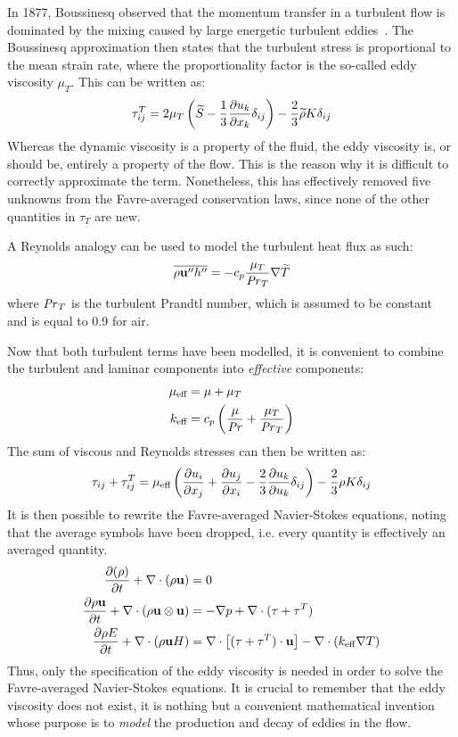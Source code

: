In 1877, Boussinesq observed that the momentum transfer in a turbulent flow is dominated by the mixing caused by large energetic turbulent eddies~\cite{blazek2015computational}. The Boussinesq approximation then states that the turbulent stress is proportional to the mean strain rate, where the proportionality factor is the so-called eddy viscosity $\mu_T$. This can be written as:
\begin{equation}
    \tau^T_{ij} = 2\mu_T \left(
        \widetilde{S} - \frac{1}{3} \frac{\partial u_k}{\partial x_k} \delta_{ij}
    \right) - \frac{2}{3}\widetilde{\rho}K\delta_{ij}
    \label{eq:bouss}
\end{equation}
Whereas the dynamic viscosity is a property of the fluid, the eddy viscosity is, or should be, entirely a property of the flow. This is the reason why it is difficult to correctly approximate the term. Nonetheless, this has effectively removed five unknowns from the Favre-averaged conservation laws, since none of the other quantities in $\tau_T$ are new.

A Reynolds analogy can be used to model the turbulent heat flux as such:
\begin{equation}
    \overline{\rho \mathbf{u}'' h''} = -c_p\frac{\mu_T}{\mbox{\textit{Pr}}_T}\nabla\widetilde{T}
\end{equation}
where $\mbox{\textit{Pr}}_T$ is the turbulent Prandtl number, which is assumed to be constant and is equal to 0.9 for air.

Now that both turbulent terms have been modelled, it is convenient to combine the turbulent and laminar components into \textit{effective} components:
\begin{align*}
    \mu_{\text{eff}} &= \mu + \mu_T\\
    k_{\text{eff}} &= c_p\left(
        \frac{\mu}{\mbox{\textit{Pr}}} + \frac{\mu_T}{\mbox{\textit{Pr}}_T}
    \right)
\end{align*}
The sum of viscous and Reynolds stresses can then be written as:
\begin{align*}
    \tau_{ij} + \tau_{ij}^T =
        \mu_{\text{eff}}\left(
             \frac{\partial u_i}{\partial x_j}  +  \frac{\partial u_j}{\partial x_i} 
            - \frac{2}{3} \frac{\partial u_k}{\partial u_k} \delta_{ij}
        \right) - \frac{2}{3}\rho K \delta_{ij}
\end{align*}
It is then possible to rewrite the Favre-averaged Navier-Stokes equations, noting that the average symbols have been dropped, i.e. every quantity is effectively an averaged quantity.
\begin{align}
      \frac{\partial (\rho )}{\partial t}  + \nabla \cdot (\rho  \mathbf{u})  &= 0 \label{eq:fansmass}\\
     \frac{\partial \rho \mathbf{u}}{\partial t}  + \nabla\cdot(\rho\mathbf{u}\otimes\mathbf{u}) &=
        -\nabla p + \nabla\cdot(\tau + \tau^T) \label{eq:fansmom}
    \\
     \frac{\partial \rho E}{\partial t}  + \nabla\cdot (\rho \mathbf{u} H) &=
        \nabla\cdot \left[
            (\tau + \tau^T) \cdot \mathbf{u}
        \right]
        - \nabla\cdot\left(k_{\text{eff}}\nabla T\right) \label{eq:fansenergy}
\end{align}
Thus, only the specification of the eddy viscosity is needed in order to solve the Favre-averaged Navier-Stokes equations. It is crucial to remember that the eddy viscosity does not exist, it is nothing but a convenient mathematical invention whose purpose is to \emph{model} the production and decay of eddies in the flow.
%
